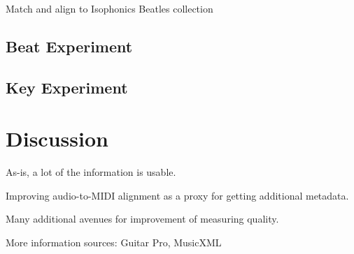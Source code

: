 \documentclass{article}
\begin{document}
Match and align to Isophonics Beatles collection

\subsection{Beat Experiment}

\subsection{Key Experiment}

\section{Discussion}
\label{sec:discussion}

As-is, a lot of the information is usable.

Improving audio-to-MIDI alignment as a proxy for getting additional metadata.

Many additional avenues for improvement of measuring quality.

More information sources: Guitar Pro, MusicXML


\end{document}
